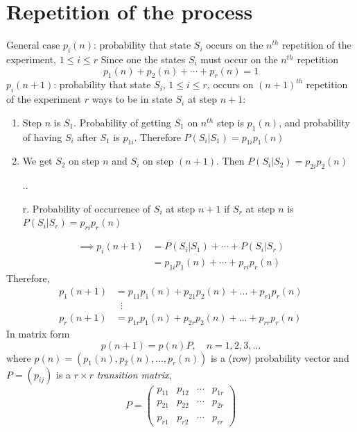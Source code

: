 \documentclass[aspectratio=169]{beamer}
\begin{document}
\section{Repetition of the process}
\begin{frame}{General case}
$p_i(n)$: probability that state $S_i$ occurs on the $n^{th}$ repetition of the experiment, $1\leq i\leq r$
\vfill
Since one the states $S_i$ must occur on the $n^{th}$ repetition
\[
p_1(n)+p_2(n)+\cdots+p_r(n)=1
\]
$p_i(n+1)$: probability that state $S_i$, $1\leq i\leq r$, occurs on $(n+1)^{th}$ repetition of the experiment
\vfill
$r$ ways to be in state $S_i$ at step $n+1$:
\begin{enumerate}
\item Step $n$ is $S_1$. Probability of getting $S_1$ on $n^{th}$ step is $p_1(n)$, and probability of having $S_i$ after $S_1$ is $p_{1i}$. Therefore $P(S_i|S_1)=p_{1i}p_1(n)$
\item We get $S_2$ on step $n$ and $S_i$ on step $(n+1)$. Then $P(S_i|S_2)=p_{2i}p_2(n)$
\item[..]
\item[r.] Probability of occurrence of $S_i$ at step $n+1$ if $S_r$ at step $n$ is $P(S_i|S_r)=p_{ri}p_r(n)$
\end{enumerate}
\end{frame}


\begin{frame}
\begin{align*}
\implies
p_i(n+1) &= P(S_i|S_1)+\cdots+P(S_i|S_r) \\
&= p_{1i}p_1(n)+\cdots+p_{ri}p_r(n)
\end{align*}
Therefore,
\begin{align*}
p_1(n+1) &= p_{11}p_1(n)+p_{21}p_2(n)+\dots+p_{r1}p_r(n) \\
& \;\;\vdots\\
p_r(n+1) &= p_{1r}p_1(n)+p_{2r}p_2(n)+\dots+p_{rr}p_r(n)
\end{align*}
\vfill
In matrix form
\[
p(n+1)=p(n)P, \quad n=1,2,3,\dots
\]
where $p(n)=(p_1(n),p_{2}(n),\dots , p_r(n))$ is a (row) probability vector and $P=(p_{ij})$ is a $r\times r$ \emph{transition matrix},
\[
P=
\begin{pmatrix}
p_{11} & p_{12} & \cdots & p_{1r} \\
p_{21} & p_{22} & \cdots & p_{2r} \\
&&& \\
p_{r1} & p_{r2} & \cdots & p_{rr}
\end{pmatrix}
\]
\end{frame}
\end{document}
